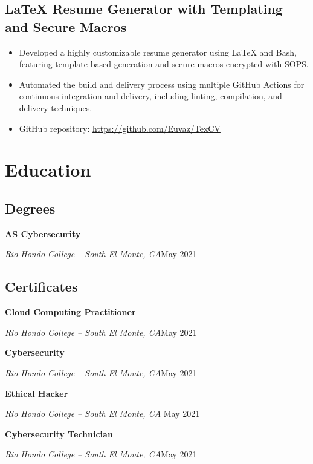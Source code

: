 \documentclass[a4paper]{article}
\begin{document}
\subsection{LaTeX Resume Generator with Templating and Secure Macros}
\begin{itemize}
    \item Developed a highly customizable resume generator using LaTeX and Bash, featuring template-based generation and secure macros encrypted with SOPS\@.
    \item Automated the build and delivery process using multiple GitHub Actions for continuous integration and delivery, including linting, compilation, and delivery techniques.
    \item GitHub repository: \url{https://github.com/Euvaz/TexCV}
\end{itemize}

\section{Education}
\begin{minipage}{\textwidth}
\subsection{Degrees}
\textbf{AS Cybersecurity}\par
\textit{Rio Hondo College -- South El Monte, CA}\hfill May 2021
\end{minipage}

\vspace{1.5em}
\begin{minipage}{\textwidth}
\subsection{Certificates}
\textbf{Cloud Computing Practitioner}\par
\textit{Rio Hondo College -- South El Monte, CA}\hfill May 2021

\medskip
\textbf{Cybersecurity}\par
\textit{Rio Hondo College -- South El Monte, CA}\hfill May 2021

\medskip
\textbf{Ethical Hacker}\par
\textit{Rio Hondo College -- South El Monte, CA \hfill}May 2021

\medskip
\textbf{Cybersecurity Technician}\par
\textit{Rio Hondo College -- South El Monte, CA}\hfill May 2021
\end{minipage}
\end{document}
